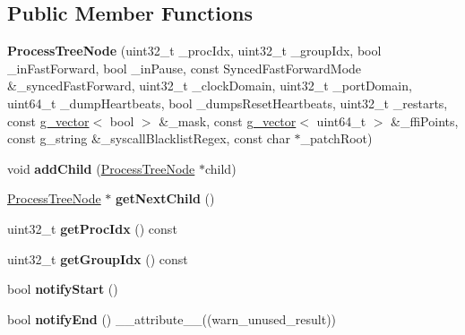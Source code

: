 \subsection*{Public Member Functions}
\begin{DoxyCompactItemize}
\item 
\hypertarget{classProcessTreeNode_adb6f2f57b0c7dfb4459c421dd642db9f}{{\bfseries Process\-Tree\-Node} (uint32\-\_\-t \-\_\-proc\-Idx, uint32\-\_\-t \-\_\-group\-Idx, bool \-\_\-in\-Fast\-Forward, bool \-\_\-in\-Pause, const Synced\-Fast\-Forward\-Mode \&\-\_\-synced\-Fast\-Forward, uint32\-\_\-t \-\_\-clock\-Domain, uint32\-\_\-t \-\_\-port\-Domain, uint64\-\_\-t \-\_\-dump\-Heartbeats, bool \-\_\-dumps\-Reset\-Heartbeats, uint32\-\_\-t \-\_\-restarts, const \hyperlink{classg__vector}{g\-\_\-vector}$<$ bool $>$ \&\-\_\-mask, const \hyperlink{classg__vector}{g\-\_\-vector}$<$ uint64\-\_\-t $>$ \&\-\_\-ffi\-Points, const g\-\_\-string \&\-\_\-syscall\-Blacklist\-Regex, const char $\ast$\-\_\-patch\-Root)}\label{classProcessTreeNode_adb6f2f57b0c7dfb4459c421dd642db9f}

\item 
\hypertarget{classProcessTreeNode_a9d6d52ef8c9bc5222b434db0dc7e5b30}{void {\bfseries add\-Child} (\hyperlink{classProcessTreeNode}{Process\-Tree\-Node} $\ast$child)}\label{classProcessTreeNode_a9d6d52ef8c9bc5222b434db0dc7e5b30}

\item 
\hypertarget{classProcessTreeNode_a7adddbecca58d0bdf6937e6019e47447}{\hyperlink{classProcessTreeNode}{Process\-Tree\-Node} $\ast$ {\bfseries get\-Next\-Child} ()}\label{classProcessTreeNode_a7adddbecca58d0bdf6937e6019e47447}

\item 
\hypertarget{classProcessTreeNode_aba159f52890875d4869f002c3748a8db}{uint32\-\_\-t {\bfseries get\-Proc\-Idx} () const }\label{classProcessTreeNode_aba159f52890875d4869f002c3748a8db}

\item 
\hypertarget{classProcessTreeNode_a2b7ca370831a0b647b52e8ef908e08ae}{uint32\-\_\-t {\bfseries get\-Group\-Idx} () const }\label{classProcessTreeNode_a2b7ca370831a0b647b52e8ef908e08ae}

\item 
\hypertarget{classProcessTreeNode_af42f3f697cb40a638e11ec922206a69e}{bool {\bfseries notify\-Start} ()}\label{classProcessTreeNode_af42f3f697cb40a638e11ec922206a69e}

\item 
\hypertarget{classProcessTreeNode_a6e9072197aed03980e448dbc5f851774}{bool {\bfseries notify\-End} () \-\_\-\-\_\-attribute\-\_\-\-\_\-((warn\-\_\-unused\-\_\-result))}\label{classProcessTreeNode_a6e9072197aed03980e448dbc5f851774}


\end{DoxyCompactItemize}
